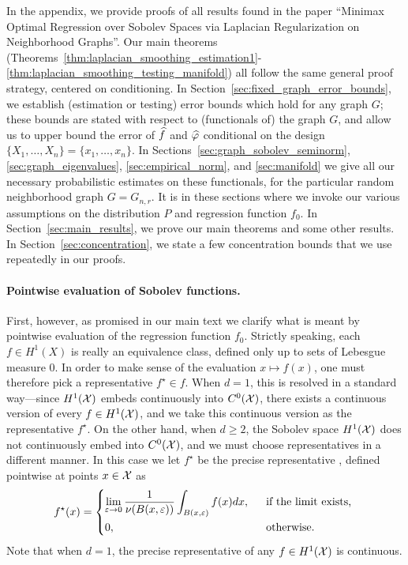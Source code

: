 \noindent In the appendix, we provide proofs of all results found in the paper ``Minimax Optimal Regression over Sobolev Spaces via Laplacian Regularization on Neighborhood Graphs''. Our main theorems (Theorems~\ref{thm:laplacian_smoothing_estimation1}-\ref{thm:laplacian_smoothing_testing_manifold}) all follow the same general proof strategy, centered on conditioning. In Section~\ref{sec:fixed_graph_error_bounds}, we establish (estimation or testing) error bounds which hold for any graph $G$; these bounds are stated with respect to (functionals of) the graph $G$, and allow us to upper bound the error of $\widehat{f}$ and $\widehat{\varphi}$ conditional on the design $\{X_1,\ldots,X_n\} = \{x_1,\ldots,x_n\}$. In Sections~\ref{sec:graph_sobolev_seminorm}, \ref{sec:graph_eigenvalues}, \ref{sec:empirical_norm}, and \ref{sec:manifold} we give all our necessary probabilistic estimates on these functionals, for the particular random neighborhood graph $G = G_{n,r}$. It is in these sections where we invoke our various assumptions on the distribution $P$ and regression function $f_0$. In Section~\ref{sec:main_results}, we prove our main theorems and some other results. In Section~\ref{sec:concentration}, we state a few concentration bounds that we use repeatedly in our proofs.

\paragraph{Pointwise evaluation of Sobolev functions.}
First, however, as promised in our main text we clarify what is meant by pointwise evaluation of the regression function $f_0$. Strictly speaking, each $f \in H^1(X)$ is really an equivalence class, defined only up to sets of Lebesgue measure 0. In order to make sense of the evaluation $x \mapsto f(x)$, one must therefore pick a representative $f^{\star} \in f$. When $d = 1$, this is resolved in a standard way---since $H^1(\mathcal{X})$ embeds continuously into $C^0(\mathcal{X})$, there exists a continuous version of every $f \in H^1(\mathcal{X})$, and we take this continuous version as the representative $f^{\star}$. On the other hand, when $d \geq 2$, the Sobolev space $H^1(\mathcal{X})$ does not continuously embed into $C^0(\mathcal{X})$, and we must choose representatives in a different manner. In this case we let $f^{\star}$ be the precise representative \citep{evans15}, defined pointwise at points $x \in \mathcal{X}$ as
\begin{equation*}
f^{\star}(x) = 
\begin{dcases*}
\lim_{\varepsilon \to 0} \frac{1}{\nu(B(x,\varepsilon))} \int_{B(x,\varepsilon)} f(x) dx,&~~\textrm{if the limit exists,} \\
0,&~~\textrm{otherwise.}
\end{dcases*}
\end{equation*}
Note that when $d = 1$, the precise representative of any $f \in H^1(\mathcal{X})$ is continuous. 

